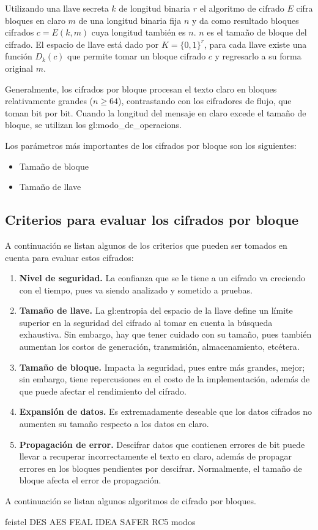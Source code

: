 Utilizando una llave secreta $k$ de longitud binaria $r$ el algoritmo de
cifrado $E$ cifra bloques en claro $m$ de una longitud binaria fija $n$ y
da como resultado bloques cifrados $c = E (k,m)$ cuya longitud también es
$n$. $n$ es el tamaño de bloque del cifrado.
El espacio de llave está dado por $K = \{0,1\}^r$, para cada llave existe una
función $D_k(c)$ que permite tomar un bloque cifrado $c$ y regresarlo a su
forma original $m$.

Generalmente, los cifrados por bloque procesan el texto claro en bloques
relativamente grandes ($n \geq 64$), contrastando con los cifradores de
flujo, que toman bit por bit. Cuando la longitud del mensaje en claro excede
el tamaño de bloque, se utilizan los \glspl{gl:modo_de_operacion}.

Los parámetros más importantes de los cifrados por bloque son los
siguientes:
\begin{itemize}
  \item Tamaño de bloque
  \item Tamaño de llave
\end{itemize}

\subsection{Criterios para evaluar los cifrados por bloque}

A continuación se listan algunos de los criterios que pueden ser tomados
en cuenta para evaluar estos cifrados:
\begin{enumerate}
  \item \textbf{Nivel de seguridad.} La confianza que se le tiene a un
    cifrado va creciendo con el tiempo, pues va siendo analizado y
    sometido a pruebas.
  \item \textbf{Tamaño de llave.} La \gls{gl:entropia} del espacio de la
    llave define un límite superior en la seguridad del cifrado al tomar en
    cuenta la búsqueda exhaustiva. Sin embargo, hay que tener cuidado
    con su tamaño, pues también aumentan los costos de generación,
    transmisión, almacenamiento, etcétera.
  \item \textbf{Tamaño de bloque.} Impacta la seguridad, pues entre más
    grandes, mejor; sin embargo, tiene repercusiones en el costo de la
    implementación, además de que puede afectar el rendimiento del
    cifrado.
  \item \textbf{Expansión de datos.} Es extremadamente deseable que los
    datos cifrados no aumenten su tamaño respecto a los datos en claro.
  \item \textbf{Propagación de error.} Descifrar datos que contienen
    errores de bit puede llevar a recuperar incorrectamente el texto en
    claro, además de propagar errores en los bloques pendientes por
    descifrar. Normalmente, el tamaño de bloque afecta el error de
    propagación.
\end{enumerate}

A continuación se listan algunos algoritmos de cifrado por bloques.

{feistel}
{DES}
{AES}
{FEAL}
{IDEA}
{SAFER}
{RC5}
{modos}
